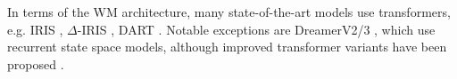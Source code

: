  
In terms of the WM architecture, many state-of-the-art models use transformers, e.g. 
IRIS \citep{micheli2022transformers},
$\Delta$-IRIS \citep{micheli2024efficient},
DART \citep{agarwal2024learning}.
Notable exceptions are DreamerV2/3  \citep{hafner2020mastering,hafner2023mastering}, which use recurrent state space models,
although improved transformer variants have been proposed 
\citep{robine2023transformer,zhang2024storm,chen2202transdreamer}.
